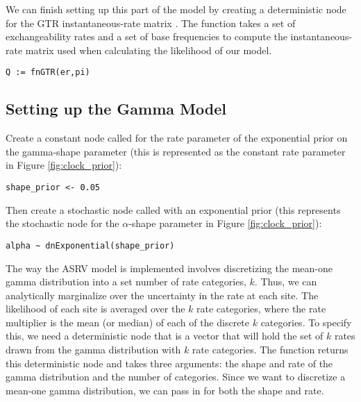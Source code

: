We can finish setting up this part of the model by creating a deterministic node for the GTR instantaneous-rate matrix . 
The  function takes a set of exchangeability rates and a set of base frequencies to compute the instantaneous-rate matrix used when calculating the likelihood of our model.
{\tt \begin{snugshade*}
\begin{lstlisting}
Q := fnGTR(er,pi)
\end{lstlisting}
\end{snugshade*}}


\subsection{Setting up the Gamma Model}

Create a constant node called  for the rate parameter of the exponential prior on the gamma-shape parameter (this is represented as the constant rate parameter in Figure \ref{fig:clock_prior}):
{\tt\begin{snugshade*}
\begin{lstlisting}
shape_prior <- 0.05                                                                             
\end{lstlisting}
\end{snugshade*}}

Then create a stochastic node called  with an exponential prior (this represents the stochastic node for the $\alpha$-shape parameter in Figure \ref{fig:clock_prior}):
{\tt\begin{snugshade*}
\begin{lstlisting}
alpha ~ dnExponential(shape_prior)
\end{lstlisting}
\end{snugshade*}}

The way the ASRV model is implemented involves discretizing the mean-one gamma distribution into a set number of rate categories, $k$. 
Thus, we can analytically marginalize over the uncertainty in the rate at each site. 
The likelihood of each site is averaged over the $k$ rate categories, where the rate multiplier is the mean (or median) of each of the discrete $k$ categories. 
To specify this, we need a deterministic node that is a vector that will hold the set of $k$ rates drawn from the gamma distribution with $k$ rate categories. 
The  function returns this deterministic node and takes three arguments: the shape and rate of the gamma distribution and the number of categories. 
Since we want to discretize a mean-one gamma distribution, we can pass in  for both the shape and rate.

